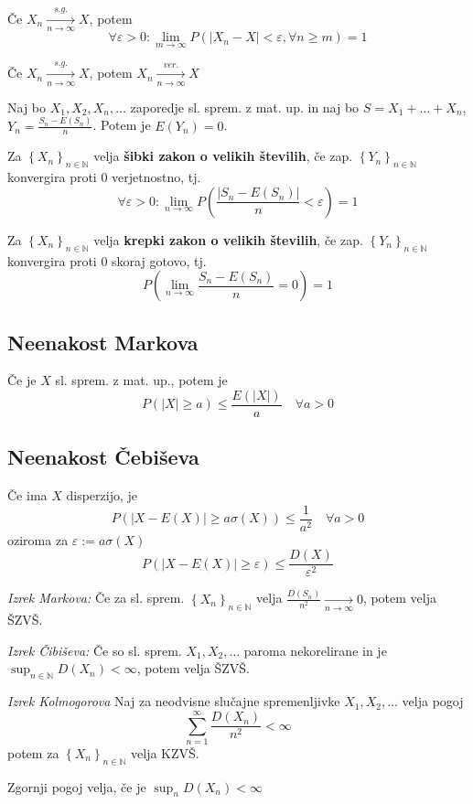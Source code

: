 \begin{multicols}{5}
Če $X_n \xrightarrow[n \to \infty]{s.g.} X$, potem
\[\forall \varepsilon > 0: \lim_{m \to \infty} P(|X_n - X| < \varepsilon, \forall n \geq m) = 1\]

Če $X_n \xrightarrow[n \to \infty]{s.g.} X$, potem $X_n \xrightarrow[n \to \infty]{ver.} X$


Naj bo $X_1, X_2, X_n, \dots$ zaporedje sl. sprem. z mat. up. in naj bo $S = X_1 +\dots + X_n$, $Y_n = \frac{S_n - E(S_n)}{n}$. Potem je $E(Y_n) = 0$.

Za $\left\{ X_n \right\}_{n \in \mathbb{N}} $ velja \textbf{šibki zakon o velikih številih}, če zap. $\left\{ Y_n \right\}_{n \in \mathbb{N}}$
konvergira proti 0 verjetnostno, tj.
\[ \forall \varepsilon > 0: \lim_{n \to \infty} P\left(  \frac{|S_n - E(S_n)|}{n} < \varepsilon \right) = 1 \]

Za $\left\{ X_n \right\}_{n \in \mathbb{N}} $ velja \textbf{krepki zakon o velikih številih}, če zap. $\left\{ Y_n \right\}_{n \in \mathbb{N}}$
konvergira proti 0 skoraj gotovo, tj.
\[ P\left( \lim_{n \to \infty} \frac{S_n - E(S_n)}{n} = 0 \right) = 1 \]

\subsection{Neenakost Markova}
Če je $X$ sl. sprem. z mat. up., potem je
\[P(|X| \geq a) \leq \frac{E(|X|)}{a} \quad \forall a > 0\]

\subsection{Neenakost Čebiševa}
Če ima $X$ disperzijo, je
\[ P(|X - E(X)| \geq a \sigma(X)) \leq \frac{1}{a^2}  \quad \forall a > 0\]
oziroma za $\varepsilon := a \sigma(X)$
\[ P(|X-E(X)| \geq \varepsilon) \leq \frac{D(X)}{\varepsilon^2}\]

\textit{Izrek Markova:}
Če za sl. sprem. $\left\{ X_n \right\}_{n \in \mathbb{N}} $ velja $\frac{D(S_n)}{n^2} \xrightarrow[n \to \infty]{} 0$, potem velja ŠZVŠ.

\textit{Izrek Čibiševa:}
Če so sl. sprem. $ X_1, X_2, \dots $ paroma nekorelirane in je $\sup_{n \in \mathbb{N}} D(X_n) < \infty$, potem velja ŠZVŠ.

\textit{Izrek Kolmogorova}
Naj za neodvisne slučajne spremenljivke $X_1, X_2, \dots$ velja pogoj
\[ \sum_{n=1}^\infty \frac{D(X_n)}{n^2} < \infty\]
potem za  $\left\{ X_n \right\}_{n \in \mathbb{N}} $ velja KZVŠ.

Zgornji pogoj velja, če je $\sup_n D(X_n) < \infty$


\end{multicols}
